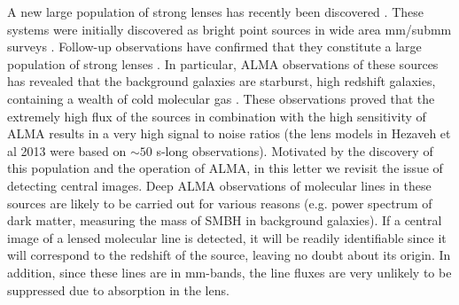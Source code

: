 \documentclass[chicago]{emulateapj}
\begin{document}



A new large population of strong lenses has recently been discovered \citep{}. These systems were initially discovered as bright point sources in wide area mm/submm surveys \citep{}. Follow-up observations have confirmed that they constitute a large population of strong lenses \citep{}.
In particular, ALMA observations of these sources has revealed that the background galaxies are starburst, high redshift galaxies, containing a wealth of cold molecular gas \cite{}.  These observations proved that the extremely high flux of the sources in combination with the high sensitivity of ALMA results in a very high signal to noise ratios (the lens models in Hezaveh et al 2013 were based on $\sim50$ s-long observations).
Motivated by the discovery of this population and the operation of ALMA, in this letter we revisit the issue of detecting central images.
Deep ALMA observations of molecular lines in these sources are likely to be carried out for various reasons (e.g. power spectrum of dark matter, measuring the mass of SMBH in background galaxies). If a central image of a lensed molecular line is detected, it will be readily identifiable since it will correspond to the redshift of the source, leaving no doubt about its origin. In addition, since these lines are in mm-bands, the line fluxes are very unlikely to be suppressed due to absorption in the lens. 
\end{document}

